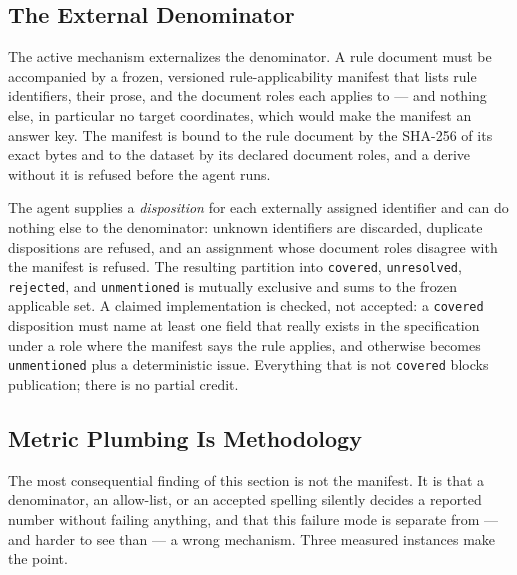 \subsection{The External Denominator}

The active mechanism externalizes the denominator. A rule document must be accompanied by a frozen,
versioned rule-applicability manifest that lists rule identifiers, their prose, and the document roles
each applies to --- and nothing else, in particular no target coordinates, which would make the manifest
an answer key. The manifest is bound to the rule document by the SHA-256 of its exact bytes and to the
dataset by its declared document roles, and a derive without it is refused before the agent runs.

The agent supplies a \emph{disposition} for each externally assigned identifier and can do nothing else
to the denominator: unknown identifiers are discarded, duplicate dispositions are refused, and an
assignment whose document roles disagree with the manifest is refused. The resulting partition into
\texttt{covered}, \texttt{unresolved}, \texttt{rejected}, and \texttt{unmentioned} is mutually exclusive
and sums to the frozen applicable set. A claimed implementation is checked, not accepted: a
\texttt{covered} disposition must name at least one field that really exists in the specification under a
role where the manifest says the rule applies, and otherwise becomes \texttt{unmentioned} plus a
deterministic issue. Everything that is not \texttt{covered} blocks publication; there is no partial
credit.

\subsection{Metric Plumbing Is Methodology}
\label{sec:der:coverage:plumbing}

The most consequential finding of this section is not the manifest. It is that a denominator, an
allow-list, or an accepted spelling silently decides a reported number without failing anything, and that
this failure mode is separate from --- and harder to see than --- a wrong mechanism. Three measured
instances make the point.


